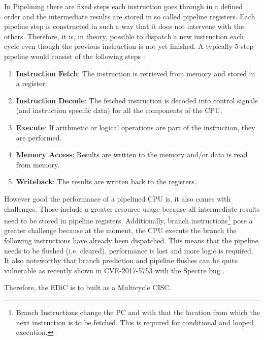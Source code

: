 In Pipelining there are fixed steps each instruction goes through in a defined order and the intermediate results are stored in so called pipeline registers.
Each pipeline step is constructed in such a way that it does not intervene with the others.
Therefore, it is, in theory, possible to dispatch a new instruction each cycle even though the previous instruction is not yet finished.
A typically 5-step pipeline would consist of the following steps \cite{PattersonDavid2016RuRD}:
\begin{enumerate}
  \item \textbf{Instruction Fetch}: The instruction is retrieved from memory and stored in a register.
  \item \textbf{Instruction Decode}: The fetched instruction is decoded into control signals (and instruction specific data) for all the components of the \gls{CPU}.
  \item \textbf{Execute}: If arithmetic or logical operations are part of the instruction, they are performed.
  \item \textbf{Memory Access}: Results are written to the memory and/or data is read from memory.
  \item \textbf{Writeback}: The results are written back to the registers.
\end{enumerate}
However good the performance of a pipelined \gls{CPU} is, it also comes with challenges.
Those include a greater resource usage because all intermediate results need to be stored in pipeline registers.
Additionally, branch instructions\footnote{Branch Instructions change the \gls{PC} and with that the location from which the next instruction is to be fetched. This is required for conditional and looped execution.} pose a greater challenge because at the moment, the \gls{CPU} execute the branch the following instructions have already been dispatched.
This means that the pipeline needs to be flushed (i.e. cleared), performance is lost and more logic is required.
It also noteworthy that branch prediction and pipeline flushes can be quite vulnerable as recently shown in CVE-2017-5753 with the Spectre bug \cite{CVE-2017-5753}.

Therefore, the \gls{EDiC} is to built as a Multicycle \gls{CISC}.

